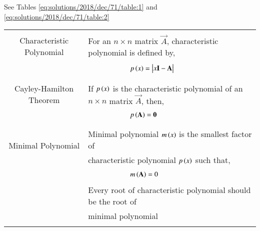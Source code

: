 See Tables \ref{eq:solutions/2018/dec/71/table:1} and \ref{eq:solutions/2018/dec/71/table:2}


\begin{table*}[ht!]
\centering
\begin{tabular}{|c|l|}
    \hline
	\multirow{3}{*}{Characteristic Polynomial} 
	& \\
	& For an $n\times n$ matrix $\vec{A}$, characteristic polynomial is defined by,\\
	&\\
	& $\qquad\qquad\qquad p\brak{x}=\mydet{x\Vec{I}-\Vec{A}}$\\
	&\\
	\hline
	\multirow{3}{*}{Cayley-Hamilton Theorem}
    &\\
    & If $p\left(x\right)$ is the characteristic polynomial of an $n\times n$ matrix $\vec{A}$, then,\\
    &\\
    &$\qquad \qquad \qquad p\left(\mathbf{A}\right)=\mathbf{0}$\\
    &\\
    \hline
	\multirow{3}{*}{Minimal Polynomial} 
	&\\
	& Minimal polynomial $m\left(x\right)$ is the smallest factor of\\
	&characteristic polynomial $p\left(x\right)$ such that,\\
	&\\
	& $\qquad \qquad \qquad m\left(\mathbf{A}\right)=0$\\
	& \\
	& Every root of characteristic polynomial should be the root of\\
	&minimal polynomial\\
	&\\
    \hline
\end{tabular}
    \caption{Definitions}
\label{eq:solutions/2018/dec/71/table:1}
\end{table*}

